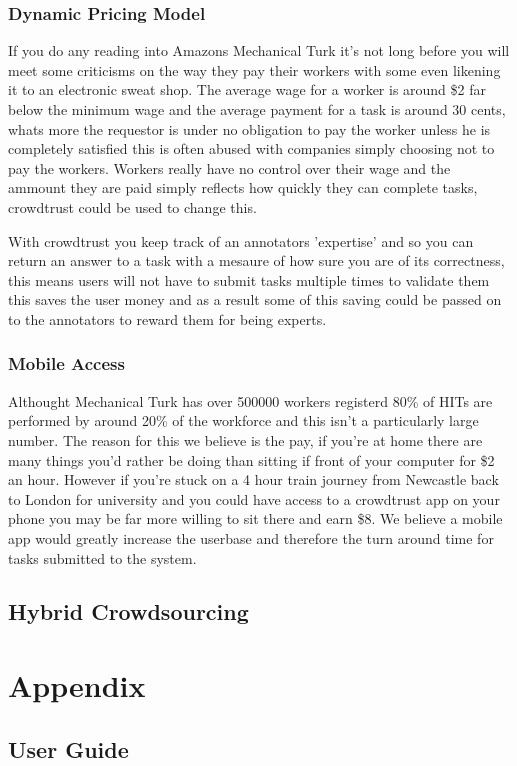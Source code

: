 \documentclass[11pt]{article}
\begin{document}
\subsubsection{Dynamic Pricing Model}
If you do any reading into Amazons Mechanical Turk it's not long before you will meet some criticisms on the way they pay their workers with some
even likening it to an electronic sweat shop. The average wage for a worker is around \$2 far below the minimum wage and the average payment for 
a task is around 30 cents, whats more the requestor is under no obligation to pay the worker unless he is completely satisfied this is often abused
with companies simply choosing not to pay the workers. Workers really have no control over their wage and the ammount they are paid simply 
reflects how quickly they can complete tasks, crowdtrust could be used to change this.

With crowdtrust you keep track of an annotators 'expertise' and so you can return an answer to a task with a mesaure of how sure you are of its
correctness, this means users will not have to submit tasks multiple times to validate them this saves the user money and as a result some of this
saving could be passed on to the annotators to reward them for being experts.   

\subsubsection{Mobile Access}
Althought Mechanical Turk has over 500000 workers registerd 80\% of HITs are performed by around 20\% of the workforce and this isn't a 
particularly large number. The reason for this we believe is the pay, if you're at home there are many things you'd rather be doing than sitting
if front of your computer for \$2 an hour. However if you're stuck on a 4 hour train journey from Newcastle back to London for university and
you could have access to a crowdtrust app on your phone you may be far more willing to sit there and earn \$8. We believe a mobile app would 
greatly increase the userbase and therefore the turn around time for tasks submitted to the system. 

\subsection{Hybrid Crowdsourcing}

\section{Appendix}
\subsection{User Guide}

\begin{thebibliography}{9}

\end{thebibliography}
\end{document}
